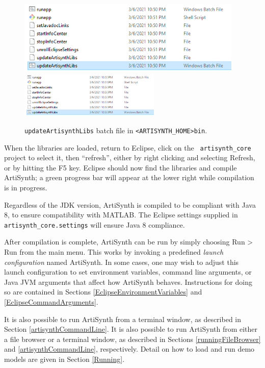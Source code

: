 \ifWindows
\begin{figure}[h]
\begin{center}
\iflatexml
   \includegraphics[]{images/UpdateArtisynthLibs}
\else
   \includegraphics[width=0.6\textwidth]{images/UpdateArtisynthLibs}
\fi
\end{center}
\caption{%
{\tt updateArtisynthLibs} batch file in {\tt <ARTISYNTH\_HOME>\SEP bin}.}
\label{UpdateArtisynthLibs:fig}
\end{figure}
\fi

When the libraries are loaded, return to Eclipse, click on the {\tt
artisynth\_core} project to select it, then ``refresh'', either by
right clicking and selecting {\sf Refresh}, or by hitting the {\sf F5}
key. Eclipse should now find the libraries and compile ArtiSynth; a
green progress bar will appear at the lower right while compilation is
in progress.

\begin{sideblock}
Regardless of the JDK version, ArtiSynth is compiled to be compliant with Java
8, to ensure compatibility with MATLAB.  The Eclipse settings supplied in {\tt
artisynth\_core\SEP .settings} will ensure Java 8 compliance.
\end{sideblock}

After compilation is complete, ArtiSynth can be run by simply choosing
{\sf Run > Run} from the main menu. This works by invoking a
predefined {\it launch configuration} named ArtiSynth.  In some cases,
one may wish to adjust this launch configuration to set environment
variables, command line arguments, or Java JVM arguments that affect
how ArtiSynth behaves.  Instructions for doing so are contained in
Sections
\ref{EclipseEnvironmentVariables} and \ref{EclipseCommandArguments}.

\ifLinux
It is also possible to run ArtiSynth from a terminal window,
as described in Section \ref{artisynthCommandLine}.
\else %
It is also possible to run ArtiSynth from either a file browser or a
terminal window, as described in Sections \ref{runningFileBrowser}
and \ref{artisynthCommandLine}, respectively.
\fi
Detail on how to load and run demo models are given in
Section \ref{Running}.


